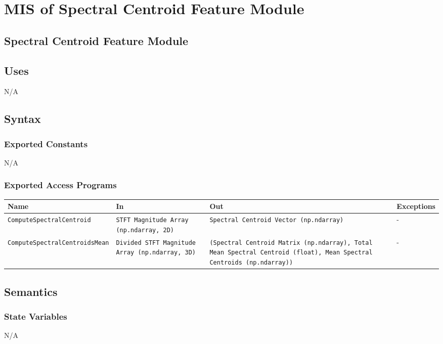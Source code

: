 \documentclass[12pt, titlepage]{article}
\begin{document}
{\color{red}
\section{MIS of Spectral Centroid Feature Module}

\subsection{Spectral Centroid Feature Module}

\subsection{Uses}
N/A

\subsection{Syntax}

\subsubsection{Exported Constants}
N/A

\subsubsection{Exported Access Programs}

\begin{center}
  \begin{tabular}{|p{6cm}|p{4cm}|p{3cm}|p{2cm}|}
  \hline
  \textbf{Name} & \textbf{In} & \textbf{Out} & \textbf{Exceptions} \\
  \hline
  \texttt{ComputeSpectralCentroid} & \texttt{STFT Magnitude Array (np.ndarray, 2D)} & \texttt{Spectral Centroid Vector (np.ndarray)} & - \\
  \hline
  \texttt{ComputeSpectralCentroidsMean} & \texttt{Divided STFT Magnitude Array (np.ndarray, 3D)} & \texttt{(Spectral Centroid Matrix (np.ndarray), Total Mean Spectral Centroid (float), Mean Spectral Centroids (np.ndarray))} & - \\
  \hline
  \end{tabular}
\end{center}
  

\subsection{Semantics}

\subsubsection{State Variables}
N/A

}
\end{document}
